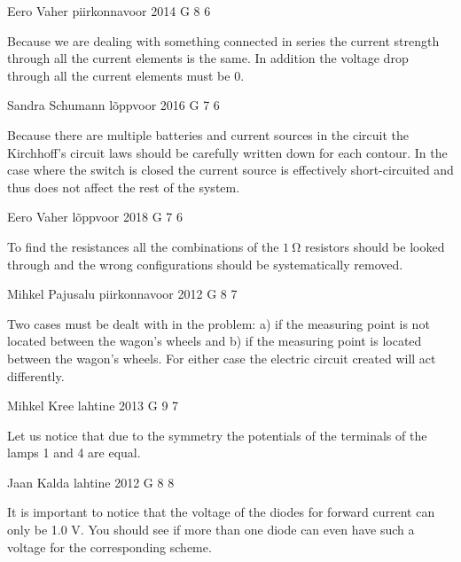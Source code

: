 \documentclass[11pt]{article}
\begin{document}
{Eero Vaher} %
{piirkonnavoor} %
{2014} %
{G 8} %
{6} %
{

\ifEngHint
Because we are dealing with something connected in series the current strength through all the current elements is the same. In addition the voltage drop through all the current elements must be 0.
\fi
}

{Sandra Schumann} %
{lõppvoor} %
{2016} %
{G 7} %
{6} %
{

\ifEngHint
Because there are multiple batteries and current sources in the circuit the Kirchhoff's circuit laws should be carefully written down for each contour. In the case where the switch is closed the current source is effectively short-circuited and thus does not affect the rest of the system.
\fi
}

{Eero Vaher} %
{lõppvoor} %
{2018} %
{G 7} %
{6} %
{

\ifEngHint
To find the resistances all the combinations of the $\SI{1}{\ohm}$ resistors should be looked through and the wrong configurations should be systematically removed.
\fi
}

{Mihkel Pajusalu} %
{piirkonnavoor} %
{2012} %
{G 8} %
{7} %
{

\ifEngHint
Two cases must be dealt with in the problem: a) if the measuring point is not located between the wagon's wheels and b) if the measuring point is located between the wagon's wheels. For either case the electric circuit created will act differently.
\fi
}

{Mihkel Kree} %
{lahtine} %
{2013} %
{G 9} %
{7} %
{

\ifEngHint
Let us notice that due to the symmetry the potentials of the terminals of the lamps 1 and 4 are equal.
\fi
}

{Jaan Kalda} %
{lahtine} %
{2012} %
{G 8} %
{8} %
{

\ifEngHint
It is important to notice that the voltage of the diodes for forward current can only be 1.0 V. You should see if more than one diode can even have such a voltage for the corresponding scheme.
\fi
}
\end{document}
